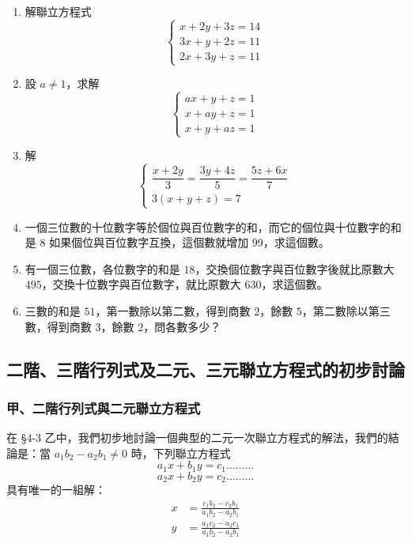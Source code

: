 \begin{enumerate}[1.]
  \item 解聯立方程式
  \begin{equation*}
  \begin{cases}
    x+2y+3z = 14 \\
    3x+y+2z = 11 \\
    2x+3y+z = 11
  \end{cases}
  \end{equation*}
  \item 設 $a \neq 1$，求解
  \begin{equation*}
  \begin{cases}
    ax+y+z = 1 \\
    x+ay+z = 1 \\
    x+y+az = 1
  \end{cases}
  \end{equation*}
  \item 解
  \begin{equation*}
  \begin{cases}
    \dfrac{x+2y}{3} = \dfrac{3y+4z}{5} = \dfrac{5z+6x}{7} \\[1em]
    3(x+y+z) = 7
  \end{cases}
  \end{equation*}
  \item 一個三位數的十位數字等於個位與百位數字的和，而它的個位與十位數字的和是 $8$ 如果個位與百位數字互換，這個數就增加 $99$，求這個數。
  \item 有一個三位數，各位數字的和是 $18$，交換個位數字與百位數字後就比原數大 $495$，交換十位數字與百位數字，就比原數大 $630$，求這個數。
  \item 三數的和是 $51$，第一數除以第二數，得到商數 $2$，餘數 $5$，第二數除以第三數，得到商數 $3$，餘數 $2$，問各數多少？
\end{enumerate}

\subsection{二階、三階行列式及二元、三元聯立方程式的初步討論}\label{sec:4-4}

\subsubsection*{甲、二階行列式與二元聯立方程式}\label{subsec:4-4-a}

在 \S 4-3 乙中，我們初步地討論一個典型的二元一次聯立方程式的解法，我們的結論是：當 $a_1 b_2 - a_2 b_1 \neq 0$ 時，下列聯立方程式
\begin{equation}\label{eq:det2_system_1}
  a_1 x + b_1 y = c_1 \dots\dots\dots
\end{equation}
\begin{equation}\label{eq:det2_system_2}
  a_2 x + b_2 y = c_2 \dots\dots\dots
\end{equation}
具有唯一的一組解：
\begin{align*}
  x &= \frac{c_1 b_2 - c_2 b_1}{a_1 b_2 - a_2 b_1} \\
  y &= \frac{a_1 c_2 - a_2 c_1}{a_1 b_2 - a_2 b_1}
\end{align*}


